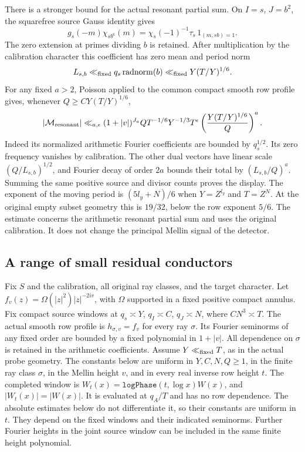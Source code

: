 \documentclass[11pt]{article}
\begin{document}
There is a stronger bound for the actual resonant partial sum.
On $I=s$, $J=b^2$, the squarefree source Gauss identity gives
\[
 g_s(-m)\chi_{sb^6}(m)
   =\chi_s(-1)^{-1}\tau_s\,
       1_{(m,sb)=1}.
\]
The zero extension at primes dividing $b$ is retained.
After multiplication by the calibration character this coefficient has
zero mean and period norm
\[
 L_{s,b}\ll_{\rm fixed}q_s\operatorname{radnorm}(b)
       \ll_{\rm fixed}Y(T/Y)^{1/6}.
\]
For any fixed $a>2$, Poisson applied to the common compact smooth row
profile gives, whenever $Q\ge C Y(T/Y)^{1/6}$,
\[
 |\mathcal M_{\rm resonant}|
 \ll_{a,\epsilon}(1+|v|)^{J_a}
       Q T^{-1/6}Y^{-1/3}T^\epsilon
       \left(\frac{Y(T/Y)^{1/6}}Q\right)^a.
\]
Indeed its normalized arithmetic Fourier coefficients are bounded by
$q_s^{1/2}$. Its zero frequency vanishes by calibration. The other dual
vectors have linear scale $(Q/L_{s,b})^{1/2}$, and Fourier decay of
order $2a$ bounds their total by $(L_{s,b}/Q)^a$.
Summing the same positive source and divisor counts proves the display.
The exponent of the moving period is $(5l_y+N)/6$ when $Y=Z^{l_y}$
and $T=Z^N$. At the original empty subset geometry this is
$19/32$, below the row exponent $5/6$.
The estimate concerns the arithmetic resonant partial sum and uses the
original calibration. It does not change the principal Mellin signal of
the detector.

\subsection{A range of small residual conductors}

Fix $S$ and the calibration, all original ray classes, and the target
character. Let $f_v(z)=\Omega(|z|^2)|z|^{-2iv}$, with $\Omega$ supported
in a fixed positive compact annulus. Fix compact source windows at
$q_s\asymp Y$, $q_I\asymp C$, $q_J\asymp N$, where $CN^3\asymp T$.
The actual smooth row profile is $h_{\sigma,v}=f_v$ for every ray
$\sigma$. Its Fourier seminorms of any fixed order are bounded by a
fixed polynomial in $1+|v|$. All dependence on $\sigma$ is retained
in the arithmetic coefficients.
Assume $Y\ll_{\rm fixed}T$, as in the actual probe geometry.
The constants below are uniform in $Y,C,N,Q\ge1$, in the finite ray class
$\sigma$, in the Mellin height $v$, and in every real inverse row height $t$.
The completed window is
$W_t(x)=\texttt{logPhase}(t,\log x)W(x)$, and $|W_t(x)|=|W(x)|$.
It is evaluated at $q_A/T$ and has no row dependence. The absolute
estimates below do not differentiate it, so their constants are uniform
in $t$. They depend on the fixed windows
and their indicated seminorms. Further Fourier heights in the joint
source window can be included in the same finite height polynomial.
\end{document}

